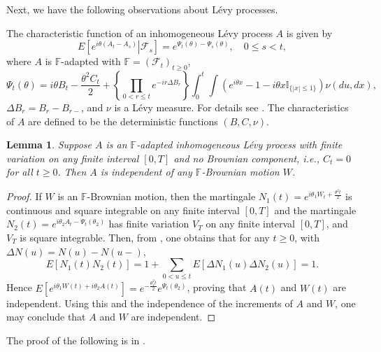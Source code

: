 \documentclass[final]{amsart}
\newtheorem{lem}[thm]{Lemma}
\theoremstyle{definition}
\numberwithin{equation}{section}
\newcommand{\dF}{\ensuremath{\mathbb{F}}}
\newcommand{\I}{\ensuremath{\mathbb{I}}}
\newcommand{\cF}{\ensuremath{\mathcal{F}}}
\begin{document}
Next, we have the following observations about L\'evy processes.

The characteristic function of an inhomogeneous L\'evy process $A$ is given by
$$
E\left[\left. e^{i\theta (A_t-A_s)}\right| \cF_s \right] = e^{\Psi_t(\theta)-\Psi_s(\theta)}, \quad 0\le s < t,
$$
where $A$ is $\mathbb{F}$-adapted with $\dF = (\cF_t)_{t\ge 0}$,
$$
\Psi_t(\theta)  = i \theta B_t  -\frac{\theta^2 C_t}{2}
+ \left\{\prod_{0<r\le t} e^{-ir\Delta B_r}\right\}\int_0^t \int \left(e^{i\theta x}-1-i\theta x\I_{\{|x|\le 1\}}\right)\nu(du,dx),
$$
$\Delta B_r = B_r-B_{r-}$, and $\nu$ is a L\'evy measure.
For details see \citet[Theorem II.4.15, Theorem II.5.2 and Corollaries II.5.11,12,13]{Jacod/Shiryaev:2003}.
The characteristics of $A$ are defined to be the deterministic functions $(B,C,\nu)$.

\begin{lem}\label{lem:main}
Suppose $A$ is an $\mathbb{F}$-adapted inhomogeneous L\'evy process with finite variation on any finite interval $[0,T]$ and no Brownian component, i.e., $C_t = 0$ for all $t\ge 0$. Then $A$ is independent of any $\mathbb{F}$-Brownian motion $W$.
\end{lem}

\begin{proof}
If $W$ is an $\mathbb{F}$-Brownian motion, then the martingale $N_1(t) = e^{i \theta_1 W_t+\frac{\theta^2 t}{2}}$ is continuous and square integrable on any finite interval $[0,T]$ and the martingale $N_2(t) = e^{i \theta_2 A_t-\Psi_t(\theta_2)}$ has finite variation $V_T$ on any finite interval $[0,T]$, and $V_T$ is square integrable. Then, from \citet{Applebaum:2004}, one obtains that for any $t\ge 0$, with
$\Delta N(u) = N(u)-N(u-)$,
$$
E[N_1(t) N_2(t)] = 1 + \sum_{ 0<u \le t}E[\Delta N_1(u) \Delta N_2(u) ] = 1.
$$
Hence $E\left[ e^{i \theta_1 W(t)+ i \theta_2 A(t)}\right]  = e^{-\frac{\theta_1^2 t}{2} }e^{\Psi_t(\theta_2)}$, proving that $A(t)$ and $W(t)$ are independent. Using this and the independence of the increments of $A$ and $W$, one may conclude that $A$ and $W$ are independent.
\end{proof}

The proof of the following is in \citet[Lemma I.3.30]{Jacod/Shiryaev:2003}.
\end{document}
